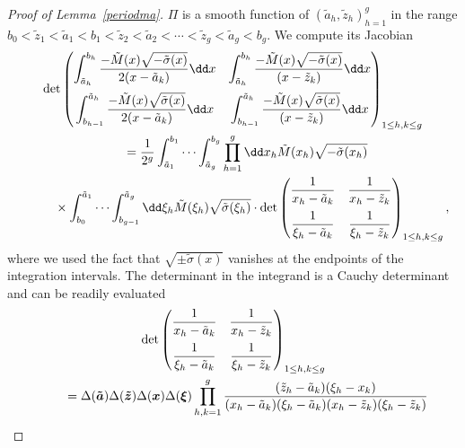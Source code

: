 \documentclass[pdftex]{sigma}
\numberwithin{equation}{section}
\begin{document}
\begin{proof}[Proof of Lemma~\ref{periodma}] $\Pi$ is a smooth
 function of $(\tilde{a}_h,\tilde{z}_h)_{h = 1}^{g}$ in the range
 $b_0 < \tilde{z}_{1} < \tilde{a}_1 < b_1 < \tilde{z}_2 < \tilde{a}_2 < \cdots < \tilde{z}_g < \tilde{a}_g < b_g$.
 We compute its Jacobian
\begin{gather}
 \det \begin{pmatrix} \displaystyle\int_{\tilde{a}_h}^{b_h} \frac{-\tilde{M}(x)\sqrt{-\tilde{\sigma}(x)}}{2(x - \tilde{a}_k)}\dd x & \displaystyle\int_{\tilde{a}_{h}}^{b_h} \frac{-\tilde{M}(x)\sqrt{-\tilde{\sigma}(x)}}{(x - \tilde{z}_k)} \dd x \vspace{2mm}\\ \displaystyle\int_{b_{h - 1}}^{\tilde{a}_h} \frac{-\tilde{M}(x)\sqrt{\tilde{\sigma}(x)}}{2(x - \tilde{a}_k)}\dd x & \displaystyle\int_{b_{h - 1}}^{\tilde{a}_h} \frac{-\tilde{M}(x)\sqrt{\tilde{\sigma}(x)}}{(x - \tilde{z}_k)} \dd x \end{pmatrix}_{1 \leq h,k \leq g} \nonumber\\
\qquad{} = \frac{1}{2^g} \int_{\tilde{a}_1}^{b_1}    \cdots \int_{\tilde{a}_{g}}^{b_g} \prod_{h = 1}^{g} \dd x_h \tilde{M}(x_h)\sqrt{-\tilde{\sigma}(x_h)}\nonumber \\
\qquad\quad{}\times
\int_{b_0}^{\tilde{a}_1}    \cdots \int_{b_{g - 1}}^{\tilde{a}_g} \dd \xi_h \tilde{M}(\xi_h) \sqrt{\tilde{\sigma}(\xi_h)} \cdot \det\begin{pmatrix} \dfrac{1}{x_h - \tilde{a}_k} & \dfrac{1}{x_h - \tilde{z}_k} \vspace{2mm}\\ \dfrac{1}{\xi_h - \tilde{a}_k} & \dfrac{1}{\xi_h - \tilde{z}_k}\end{pmatrix}_{1 \leq h,k \leq g}, \label{injt}
\end{gather}
where we used the fact that $\sqrt{\pm \tilde{\sigma}(x)}$ vanishes at the endpoints of the integration intervals. The determinant in the integrand is a Cauchy determinant and can be readily evaluated
\begin{gather*}
	\det
	\begin{pmatrix}
	 \dfrac{1}{x_h - \tilde{a}_k} & \dfrac{1}{x_h - \tilde{z}_k} \vspace{2mm}\\
	 \dfrac{1}{\xi_h - \tilde{a}_k} & \dfrac{1}{\xi_h - \tilde{z}_k}
	\end{pmatrix}_{1 \leq h,k \leq g}
\\
\qquad{}	= \Delta(\boldsymbol{\tilde{a}})\Delta(\boldsymbol{\tilde{z}}) \Delta(\boldsymbol{x}) \Delta(\boldsymbol{\xi}) \prod_{h,k = 1}^{g} \frac{ (\tilde{z}_h - \tilde{a}_k)(\xi_h - x_k) }{ (x_h - \tilde{a}_k)(\xi_h - \tilde{a}_k)(x_h - \tilde{z}_k)(\xi_h - \tilde{z}_k)}\\

\end{gather*}
\end{proof}
\end{document}
